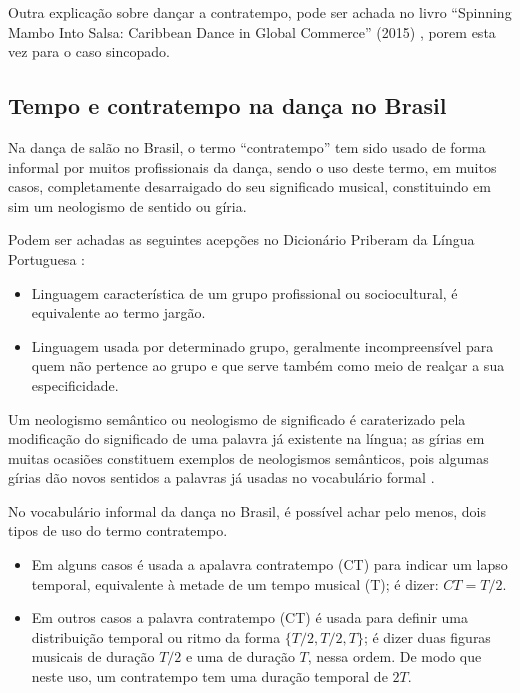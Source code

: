 Outra explicação sobre dançar a contratempo, pode ser achada
no livro ``Spinning Mambo Into Salsa: Caribbean Dance in Global Commerce'' (2015) \cite[pp. 68]{mcmains2015spinning},
porem esta vez para o caso sincopado. 


\subsection{Tempo e contratempo na dança no Brasil}
\label{subsec:contratempobrasil}
Na dança de salão no Brasil, 
o termo ``contratempo'' tem sido usado de forma informal por muitos profissionais da dança,
sendo o uso deste termo, em muitos casos, completamente desarraigado do seu significado musical,
constituindo em sim um neologismo de sentido ou gíria.

\begin{definition}[Gíria:] 
\label{def:Giria}
Podem ser achadas as seguintes acepções no Dicionário Priberam da Língua Portuguesa \cite{priberamgiria}:
\begin{itemize}
\item Linguagem característica de um grupo profissional ou sociocultural, é equivalente ao termo jargão.
\item Linguagem usada por determinado grupo, 
geralmente incompreensível para quem não pertence ao grupo e que serve também como meio de realçar a sua especificidade.
\end{itemize}
\end{definition}

\begin{definition} 
\label{def:NeologismoSemantico}
Um neologismo semântico ou neologismo de significado é caraterizado pela modificação do significado de uma palavra já existente na língua;
as gírias em muitas ocasiões constituem exemplos de neologismos semânticos, 
pois algumas gírias dão novos sentidos a palavras já usadas no vocabulário formal \cite[pp. 82-83]{correalingua}.
\end{definition}

No vocabulário informal da dança no Brasil,
é possível achar pelo menos, dois tipos de uso do termo contratempo.
\begin{itemize}
\item Em alguns casos é usada a apalavra contratempo (CT) para indicar um lapso temporal, 
equivalente à metade de um tempo musical (T); é dizer: $CT=T/2$.
\item Em outros casos a palavra contratempo (CT) é usada para definir uma distribuição temporal 
ou ritmo da forma $\{T/2, T/2, T\}$; é dizer duas figuras musicais de duração $T/2$ e uma de duração $T$,
nessa ordem. De modo que neste uso, um contratempo tem uma duração temporal de $2T$. 
\end{itemize}


